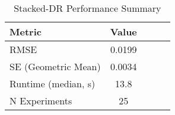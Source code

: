 \begin{table}[htbp]
\centering
\caption{Stacked-DR Performance Summary}
\label{tab:stacking}
\begin{tabular}{l|cccc}
\toprule
Metric & Value \\
\midrule
RMSE & 0.0199 \\
SE (Geometric Mean) & 0.0034 \\
Runtime (median, s) & 13.8 \\
N Experiments & 25 \\
\bottomrule
\end{tabular}
\end{table}